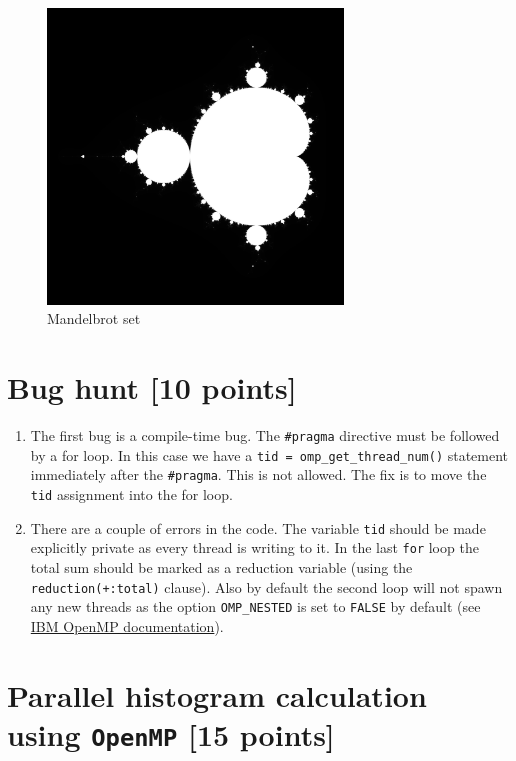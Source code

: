 \documentclass[unicode,11pt,a4paper,oneside,numbers=endperiod,openany]{scrartcl}
\begin{document}
\begin{figure}[h]
    \centering
    \includegraphics[width=0.7\textwidth]{../code/mandel/images/mandel_seq_1000.png}
    \caption{Mandelbrot set}
    \label{fig:mandel}
\end{figure}

\section{Bug hunt [10 points]}

\begin{enumerate}
    \item The first bug is a compile-time bug. The \texttt{\#pragma} directive must be followed by a for loop. In this case we have a \texttt{tid = omp\_get\_thread\_num()} statement immediately after the \texttt{\#pragma}. This is not allowed. The fix is to move the \texttt{tid} assignment into the for loop.
    \item There are a couple of errors in the code. The variable \texttt{tid} should be made explicitly private as every thread is writing to it. In the last \texttt{for} loop the total sum should be marked as a reduction variable (using the \texttt{reduction(+:total)} clause). Also by default the second loop will not spawn any new threads as the option \texttt{OMP\_NESTED} is set to \texttt{FALSE} by default (see \href{https://www.ibm.com/docs/en/xl-c-aix/13.1.2?topic=openmp-omp-nested}{IBM OpenMP documentation}).

\end{enumerate}

\section{Parallel histogram calculation using \texttt{OpenMP} [15 points]}
\end{document}
